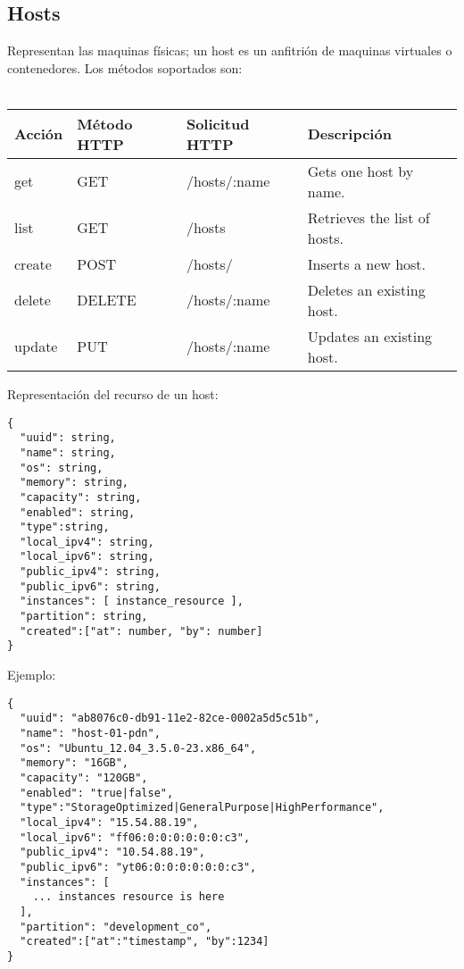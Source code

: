 \subsection{Hosts}
Representan las maquinas físicas; un host es un anfitrión de maquinas virtuales o contenedores. Los métodos soportados son:\\
\\

\begin{center}
 \begin{tabular}{| l | l | l | l |}
 \hline
  \rowcolor{blueapi}
  \textbf{Acción} & \textbf{Método HTTP} & \textbf{Solicitud HTTP} & \textbf{Descripción} \\ [0.5ex] 
  \hline\hline
  get & GET & /hosts/:name & Gets one host by name. \\
  \hline
  list & GET & /hosts & Retrieves the list of hosts. \\
  \hline  
  create & POST & /hosts/ & Inserts a new host. \\
  \hline
  delete & DELETE & /hosts/:name & Deletes an existing host. \\
  \hline  
  update & PUT & /hosts/:name & Updates an existing host. \\ [1ex] 
  \hline
\end{tabular}
\end{center}

Representación del recurso de un host:

\medskip
\begin{lstlisting}[style=json]
{
  "uuid": string,
  "name": string,
  "os": string,
  "memory": string,
  "capacity": string,
  "enabled": string,
  "type":string,
  "local_ipv4": string,
  "local_ipv6": string,
  "public_ipv4": string,
  "public_ipv6": string,
  "instances": [ instance_resource ],
  "partition": string,
  "created":["at": number, "by": number]
}
\end{lstlisting}

Ejemplo:

\medskip
\begin{lstlisting}[style=json]
{
  "uuid": "ab8076c0-db91-11e2-82ce-0002a5d5c51b",
  "name": "host-01-pdn",
  "os": "Ubuntu_12.04_3.5.0-23.x86_64",
  "memory": "16GB",
  "capacity": "120GB",
  "enabled": "true|false",
  "type":"StorageOptimized|GeneralPurpose|HighPerformance",
  "local_ipv4": "15.54.88.19",
  "local_ipv6": "ff06:0:0:0:0:0:0:c3",
  "public_ipv4": "10.54.88.19",
  "public_ipv6": "yt06:0:0:0:0:0:0:c3",
  "instances": [
    ... instances resource is here
  ],
  "partition": "development_co",
  "created":["at":"timestamp", "by":1234]
}
\end{lstlisting}

